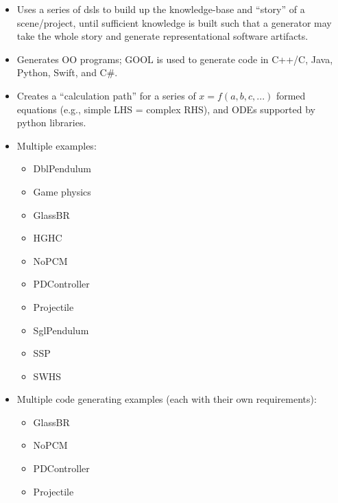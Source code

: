 \begin{itemize}

    \item Uses a series of \acfp{dsl} to build up the knowledge-base and
          ``story'' of a scene/project, until sufficient knowledge is built such that
          a generator may take the whole story and generate representational software
          artifacts.

    \item Generates OO programs; GOOL is used to generate code in C++/C, Java,
          Python, Swift, and C\#.

    \item Creates a ``calculation path'' for a series of $x = f(a,b,c,...)$
          formed equations (e.g., simple LHS = complex RHS), and ODEs supported
          by python libraries.

    \item Multiple examples:
          \begin{itemize}
              \item DblPendulum
              \item Game physics
              \item GlassBR
              \item HGHC
              \item NoPCM
              \item PDController
              \item Projectile
              \item SglPendulum
              \item SSP
              \item SWHS
          \end{itemize}

    \item Multiple code generating examples (each with their own requirements):
          \begin{itemize}
              \item GlassBR
              \item NoPCM
              \item PDController
              \item Projectile
          \end{itemize}

\end{itemize}

